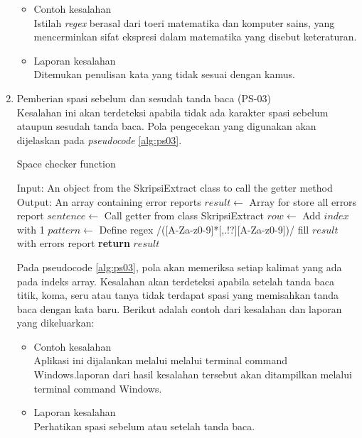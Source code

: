\begin{enumerate}
	\begin{itemize}
		\item Contoh kesalahan \\
		Istilah \textit{regex} berasal dari toeri matematika dan komputer sains, yang mencerminkan sifat ekspresi dalam matematika yang disebut keteraturan.
		\item Laporan kesalahan \\
		Ditemukan penulisan kata yang tidak sesuai dengan kamus.
	\end{itemize}
	
	\item Pemberian spasi sebelum dan sesudah tanda baca (PS-03) \\
	Kesalahan ini akan terdeteksi apabila tidak ada karakter spasi sebelum ataupun sesudah tanda baca. Pola pengecekan yang digunakan akan dijelaskan pada \textit{pseudocode} \ref{alg:ps03}.
	
\begin{minipage}{1.0\linewidth}
\begin{algorithm}[H]
    \caption{Space checker function}
	\label{alg:ps03}
	\begin{algorithmic}[1]
    		\State Input: An object from the SkripsiExtract class to call the getter method
			\State Output: An array containing error reports
			\State $result \gets$ Array for store all errors report
			\State $sentence \gets$ Call getter from class SkripsiExtract
    			\State $row \gets$ Add $index$ with 1
				\State $pattern \gets$ Define regex /([A-Za-z0-9]*[,.!?][A-Za-z0-9])/
                	\State fill $result$ with errors report
            	\EndIf
        	\EndFor
    		\State \textbf{return} $result$
    	\EndFunction
	\end{algorithmic}
\end{algorithm}
\end{minipage}
\medskip
	
	Pada pseudocode \ref{alg:ps03}, pola akan memeriksa setiap kalimat yang ada pada indeks array. Kesalahan akan terdeteksi apabila setelah tanda baca titik, koma, seru atau tanya tidak terdapat spasi yang memisahkan tanda baca dengan kata baru. Berikut adalah contoh dari kesalahan dan laporan yang dikeluarkan:
	
	\begin{itemize}
		\item Contoh kesalahan \\
		Aplikasi ini dijalankan melalui melalui terminal command Windows.laporan dari hasil kesalahan tersebut akan ditampilkan melalui terminal command Windows.
		\item Laporan kesalahan \\
		Perhatikan spasi sebelum atau setelah tanda baca.
	\end{itemize}
	

\end{enumerate}
